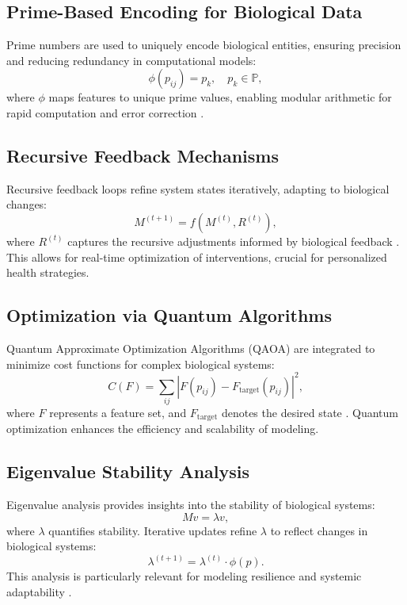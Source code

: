 \documentclass{article}
\theoremstyle{plain}
\begin{document}
\subsection{Prime-Based Encoding for Biological Data}
Prime numbers are used to uniquely encode biological entities, ensuring precision and reducing redundancy in computational models:
\begin{equation}
\phi(p_{ij}) = p_k, \quad p_k \in \mathbb{P},
\end{equation}
where $\phi$ maps features to unique prime values, enabling modular arithmetic for rapid computation and error correction \cite{primeEncoding2022}.

\subsection{Recursive Feedback Mechanisms}
Recursive feedback loops refine system states iteratively, adapting to biological changes:
\begin{equation}
M^{(t+1)} = f(M^{(t)}, R^{(t)}),
\end{equation}
where $R^{(t)}$ captures the recursive adjustments informed by biological feedback \cite{feedbackMechanisms2023}. This allows for real-time optimization of interventions, crucial for personalized health strategies.

\subsection{Optimization via Quantum Algorithms}
Quantum Approximate Optimization Algorithms (QAOA) are integrated to minimize cost functions for complex biological systems:
\begin{equation}
C(F) = \sum_{ij} \left| F(p_{ij}) - F_{\text{target}}(p_{ij}) \right|^2,
\end{equation}
where $F$ represents a feature set, and $F_{\text{target}}$ denotes the desired state \cite{qaoa2023}. Quantum optimization enhances the efficiency and scalability of modeling.

\subsection{Eigenvalue Stability Analysis}
Eigenvalue analysis provides insights into the stability of biological systems:
\begin{equation}
M v = \lambda v,
\end{equation}
where $\lambda$ quantifies stability. Iterative updates refine $\lambda$ to reflect changes in biological systems:
\begin{equation}
\lambda^{(t+1)} = \lambda^{(t)} \cdot \phi(p).
\end{equation}
This analysis is particularly relevant for modeling resilience and systemic adaptability \cite{eigenStability2023}.
\end{document}
